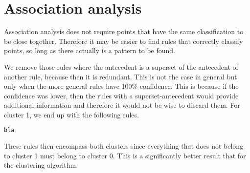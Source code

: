\documentclass[]{article}
\begin{document}
\section{Association analysis}
Association analysis does not require points that have the same classification to be close together. Therefore it may be easier to find rules that correctly classify points, so long as there actually is a pattern to be found.

We remove those rules where the antecedent is a superset of the antecedent of another rule, because then it is redundant. This is not the case in general but only when the more general rules have 100\% confidence. This is because if the confidence was lower, then the rules with a superset-antecedent would provide additional information and therefore it would not be wise to discard them. For cluster 1, we end up with the following rules.

\begin{lstlisting}
bla
\end{lstlisting}

These rules then encompass both clusters since everything that does not belong to cluster 1 must belong to cluster 0. This is a significantly better result that for the clustering algorithm.
\end{document}

